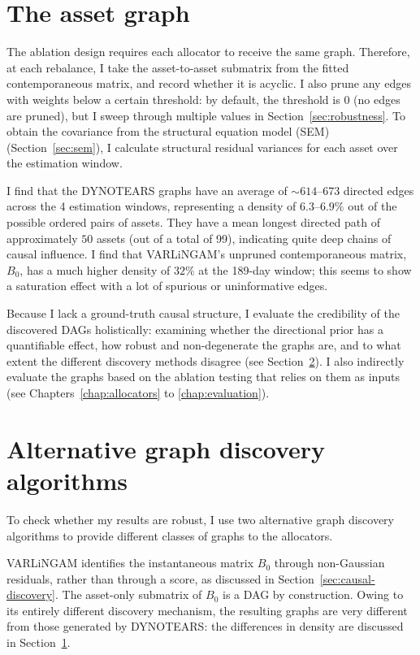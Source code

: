 \documentclass[11pt, a4paper]{report}
\begin{document}
\section{The asset graph}
\label{sec:asset-graph}

The ablation design requires each allocator to receive the same graph.
Therefore, at each rebalance, I take the asset-to-asset submatrix from the fitted contemporaneous matrix, and record whether it is acyclic. I also prune any edges with weights below a certain threshold: by default, the threshold is $0$ (no edges are pruned), but I sweep through multiple values in Section~\ref{sec:robustness}. 
To obtain the covariance from the structural equation model (SEM) (Section~\ref{sec:sem}), I calculate structural residual variances for each asset over the estimation window.

I find that the
DYNOTEARS graphs have an average of ${\sim}614$--$673$ directed edges across the 4 estimation windows, representing a
density of $6.3$--$6.9\%$ out of the possible ordered pairs of assets.
They have a mean
longest directed path of approximately $50$ assets (out of a total of 99), indicating quite deep chains of causal influence.
I find that
VARLiNGAM's unpruned contemporaneous matrix, $B_0$, has a much higher density of $32\%$ at the 189-day window; this seems to show a saturation effect with a lot of spurious or uninformative edges.

Because I lack a ground-truth causal structure, I evaluate the credibility of the discovered DAGs holistically: examining whether the directional prior has a quantifiable effect, how robust and non-degenerate the graphs are, and to what extent the different discovery methods disagree (see Section~\ref{sec:comparators}). I also indirectly evaluate the graphs based on the ablation testing that relies on them as inputs (see Chapters~\ref{chap:allocators} to \ref{chap:evaluation}).

\section{Alternative graph discovery algorithms}
\label{sec:comparators}

To check whether my results are robust, I use two alternative graph discovery algorithms to provide different classes of graphs to the allocators.

VARLiNGAM \cite{hyvarinen2010varlingam} identifies the instantaneous matrix $B_0$ through non-Gaussian residuals, rather than through a score, as discussed in Section~\ref{sec:causal-discovery}. The asset-only submatrix of $B_0$ is a DAG by construction.
Owing to its entirely different discovery mechanism, the resulting graphs are very different from those generated by DYNOTEARS: the differences in density are discussed in Section~\ref{sec:asset-graph}.
\end{document}
